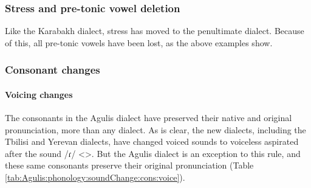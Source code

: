 \begin{table}[H]
	\centering
	\caption{Change from Classical Armenian /ov/ <> to /ɑv/ <> in the Agulis dialect}
	\label{tab:Agulis:phonology:soundChange:diphth:ov:ɑv}
\end{table}

\subsubsection{Stress and pre-tonic vowel deletion}

Like the Karabakh dialect, stress has moved to the penultimate dialect. Because of this, all pre-tonic vowels have been lost, as the above examples show.


\subsubsection{Consonant changes}


\paragraph{Voicing changes}

The consonants in the Agulis dialect have preserved their native and original pronunciation, more than any dialect. As is clear, the new dialects, including the Tbilisi and Yerevan dialects, have changed voiced sounds to voiceless aspirated after the sound /ɾ/ <>. But the Agulis dialect is an exception to this rule, and these same consonants preserve their original pronunciation (Table \ref{tab:Agulis:phonology:soundChange:cons:voice}). 


